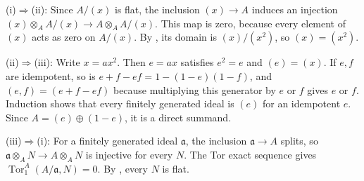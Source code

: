 (i)$\Rightarrow$(ii): Since $A/(x)$ is flat, the inclusion $(x)\to A$ induces an injection $(x)\otimes_A A/(x)\to A\otimes_A A/(x)$. This map is zero, because every element of $(x)$ acts as zero on $A/(x)$. By , its domain is $(x)/(x^2)$, so $(x)=(x^2)$.

(ii)$\Rightarrow$(iii): Write $x=ax^2$. Then $e=ax$ satisfies $e^2=e$ and $(e)=(x)$. If $e,f$ are idempotent, so is $e+f-ef=1-(1-e)(1-f)$, and $(e,f)=(e+f-ef)$ because multiplying this generator by $e$ or $f$ gives $e$ or $f$. Induction shows that every finitely generated ideal is $(e)$ for an idempotent $e$. Since $A=(e)\oplus(1-e)$, it is a direct summand.

(iii)$\Rightarrow$(i): For a finitely generated ideal $\mathfrak{a}$, the inclusion $\mathfrak{a}\to A$ splits, so $\mathfrak{a}\otimes_A N\to A\otimes_A N$ is injective for every $N$. The Tor exact sequence gives $\operatorname{Tor}_1^A(A/\mathfrak{a},N)=0$. By , every $N$ is flat.
